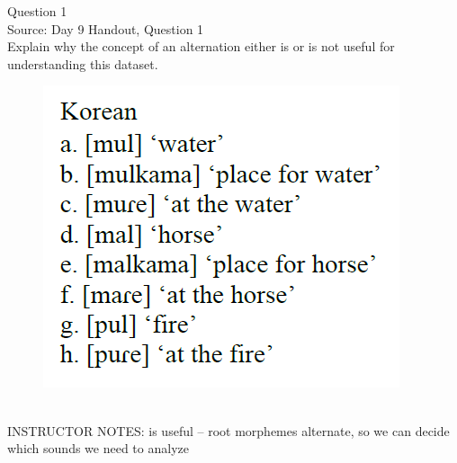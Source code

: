 \documentclass[12pt]{article}
\begin{document}
\begin{center}
\textbf{{\color{violet}{\HUGE Monday, 22 June 2020\\}}}

\textbf{{\color{violet}{\HUGE ALL EXAMS (with notes)\\}}}

\end{center}
\newpage

\begin{center}
\textbf{{\color{blue}{\HUGE START OF EXAM\\}}}

\textbf{{\color{blue}{\HUGE Student ID: 4066\\}}}

\textbf{{\color{blue}{\HUGE 2:20 - 2:40 PM\\}}}

\end{center}
\newpage

{\large Question 1}\\

Source: Day 9 Handout, Question 1\\

Explain why the concept of an alternation either is or is not useful for understanding this dataset.\\

\begin{figure}[H]
\includegraphics{../images/korean.png}
\end{figure}

~\\
INSTRUCTOR NOTES: is useful -- root morphemes alternate, so we can decide which sounds we need to analyze
\end{document}

